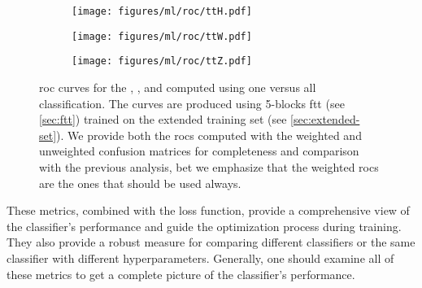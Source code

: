 \begin{figure}[htb]
    \centering
    \begin{subfigure}{0.32\textwidth}
        \texttt{[image: figures/ml/roc/ttH.pdf]}
        \caption{\tth}
        \label{fig:roc-tth}
    \end{subfigure}
    \begin{subfigure}{0.32\textwidth}
        \texttt{[image: figures/ml/roc/ttW.pdf]}
        \caption{\ttw}
        \label{fig:roc-ttw}
    \end{subfigure}
    \begin{subfigure}{0.32\textwidth}
        \texttt{[image: figures/ml/roc/ttZ.pdf]}
        \caption{\ttz}
        \label{fig:roc-ttz}
    \end{subfigure}
    \caption[\acrshort{roc} curves for \tth, \ttz, and \ttz]
    {\gls{roc} curves for the \tth, \ttw, and \ttz computed using one versus all classification. The curves are produced
        using 5-blocks \gls{ftt} (see \autoref{sec:ftt}) trained on the extended training set (see
        \autoref{sec:extended-set}). We provide both the \glspl{roc} computed with the weighted and unweighted confusion
        matrices for completeness and comparison with the previous analysis, bet we emphasize
        that the weighted \glspl{roc} are the ones that should be used always.} \label{fig:rocs}
\end{figure}


These metrics, combined with the loss function, provide a comprehensive view of the classifier's performance and guide
the optimization process during training. They also provide a robust measure for comparing different classifiers or the
same classifier with different hyperparameters. Generally, one should examine all of these metrics to get a complete
picture of the classifier's performance.